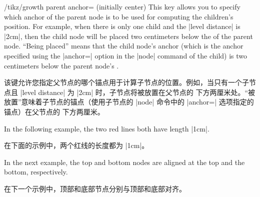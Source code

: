 \begin{key}{/tikz/growth parent anchor= (initially center)}
    This key allows you to specify which anchor of the parent node is to be
    used for computing the children's position. For example, when there is only
    one child and the |level distance| is |2cm|, then the child node will be
    placed two centimeters below the  of the parent node. ``Being
    placed'' means that the child node's anchor (which is the anchor specified
    using the |anchor=| option in the |node| command of the child) is two
    centimeters below the parent node's .

    该键允许您指定父节点的哪个锚点用于计算子节点的位置。例如，当只有一个子节点且 |level distance| 为 |2cm| 时，子节点将被放置在父节点的  下方两厘米处。“被放置”意味着子节点的锚点（使用子节点的 |node| 命令中的 |anchor=| 选项指定的锚点）在父节点的  下方两厘米。

    In the following example, the two red lines both have length |1cm|.
    
    在下面的示例中，两个红线的长度都为 |1cm|。

    \begin{codeexample}[]
\end{codeexample}

    In the next example, the top and bottom nodes are aligned at the top and
    the bottom, respectively.
    
    在下一个示例中，顶部和底部节点分别与顶部和底部对齐。

    \begin{codeexample}[]
\end{codeexample}
    
\end{key}

